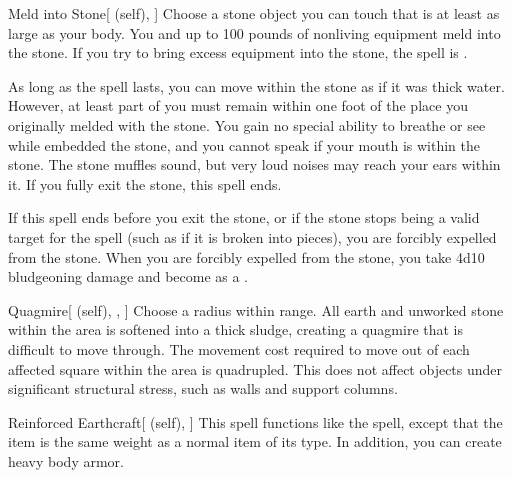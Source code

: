 \lowercase{\hypertarget{spell:Meld into Stone}{}}\label{spell:Meld into Stone}
\begin{attuneability}[\nth{2}]{\hypertarget{spell:Meld into Stone}{Meld into Stone}}[ (self), ]
Choose a stone object you can touch that is at least as large as your body.
You and up to 100 pounds of nonliving equipment meld into the stone.
If you try to bring excess equipment into the stone, the spell is .

As long as the spell lasts, you can move within the stone as if it was thick water.
However, at least part of you must remain within one foot of the place you originally melded with the stone.
You gain no special ability to breathe or see while embedded the stone, and you cannot speak if your mouth is within the stone.
The stone muffles sound, but very loud noises may reach your ears within it.
If you fully exit the stone, this spell ends.

If this spell ends before you exit the stone, or if the stone stops being a valid target for the spell (such as if it is broken into pieces), you are forcibly expelled from the stone.
When you are forcibly expelled from the stone, you take 4d10 bludgeoning damage and become  as a .
\end{attuneability}
\vspace{0.25em}



\lowercase{\hypertarget{spell:Quagmire}{}}\label{spell:Quagmire}
\begin{attuneability}[\nth{2}]{\hypertarget{spell:Quagmire}{Quagmire}}[ (self), , ]
Choose a \areamed radius within \rngmed range.
All earth and unworked stone within the area is softened into a thick sludge, creating a quagmire that is difficult to move through.
The movement cost required to move out of each affected square within the area is quadrupled.
This does not affect objects under significant structural stress, such as walls and support columns.
\end{attuneability}
\vspace{0.25em}



\lowercase{\hypertarget{spell:Reinforced Earthcraft}{}}\label{spell:Reinforced Earthcraft}
\begin{attuneability}[\nth{2}]{\hypertarget{spell:Reinforced Earthcraft}{Reinforced Earthcraft}}[ (self), ]
This spell functions like the  spell, except that the item is the same weight as a normal item of its type.
In addition, you can create heavy body armor.
\end{attuneability}
\vspace{0.25em}



